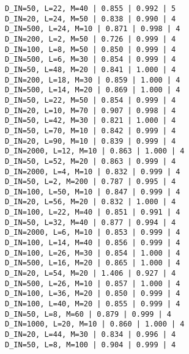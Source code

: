 \documentclass{article}
\begin{document}
\begin{verbatim}
D_IN=50, L=22, M=40 | 0.855 | 0.992 | 5
D_IN=20, L=24, M=50 | 0.838 | 0.990 | 4
D_IN=500, L=24, M=10 | 0.871 | 0.998 | 4
D_IN=200, L=2, M=50 | 0.726 | 0.999 | 4
D_IN=100, L=8, M=50 | 0.850 | 0.999 | 4
D_IN=500, L=6, M=30 | 0.854 | 0.999 | 4
D_IN=50, L=48, M=20 | 0.841 | 1.000 | 4
D_IN=200, L=18, M=30 | 0.859 | 1.000 | 4
D_IN=500, L=14, M=20 | 0.869 | 1.000 | 4
D_IN=50, L=22, M=50 | 0.854 | 0.999 | 4
D_IN=20, L=10, M=70 | 0.907 | 0.998 | 4
D_IN=50, L=42, M=30 | 0.821 | 1.000 | 4
D_IN=50, L=70, M=10 | 0.842 | 0.999 | 4
D_IN=20, L=90, M=10 | 0.839 | 0.999 | 4
D_IN=2000, L=12, M=10 | 0.863 | 1.000 | 4
D_IN=50, L=52, M=20 | 0.863 | 0.999 | 4
D_IN=2000, L=4, M=10 | 0.832 | 0.999 | 4
D_IN=50, L=2, M=200 | 0.787 | 0.995 | 4
D_IN=100, L=50, M=10 | 0.847 | 0.999 | 4
D_IN=20, L=56, M=20 | 0.832 | 1.000 | 4
D_IN=100, L=22, M=40 | 0.851 | 0.991 | 4
D_IN=50, L=32, M=40 | 0.877 | 0.994 | 4
D_IN=2000, L=6, M=10 | 0.853 | 0.999 | 4
D_IN=100, L=14, M=40 | 0.856 | 0.999 | 4
D_IN=100, L=26, M=30 | 0.854 | 1.000 | 4
D_IN=500, L=16, M=20 | 0.865 | 1.000 | 4
D_IN=20, L=54, M=20 | 1.406 | 0.927 | 4
D_IN=500, L=26, M=10 | 0.857 | 1.000 | 4
D_IN=100, L=36, M=20 | 0.850 | 0.999 | 4
D_IN=100, L=40, M=20 | 0.855 | 0.999 | 4
D_IN=50, L=8, M=60 | 0.879 | 0.999 | 4
D_IN=1000, L=20, M=10 | 0.860 | 1.000 | 4
D_IN=20, L=44, M=30 | 0.834 | 0.996 | 4
D_IN=50, L=8, M=100 | 0.904 | 0.999 | 4
\end{verbatim}

\newpage
\end{document}
